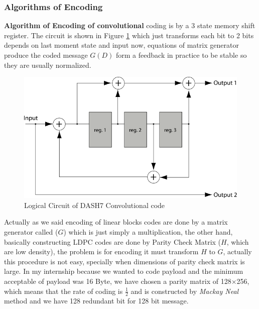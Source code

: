 \subsubsection{Algorithms of Encoding}
\textbf{Algorithm of Encoding of convolutional} coding is by a 3 state memory shift register. The circuit is shown in Figure \ref{conv_block} which just transforms each bit to 2 bits depends on last moment state and input now, equations of matrix generator produce the coded message $G(D)$ form a feedback in practice to be stable so they are usually normalized.

\begin{figure}[h]
\begin{center}
\includegraphics[scale=0.4]{Figures/encoder.png}
\end{center}
\caption{Logical Circuit of DASH7 Convolutional code}
\label{conv_block}
\end{figure}


Actually as we said encoding of linear blocks codes are done by a matrix generator called ($G$) which is just simply a multiplication, the other hand, basically constructing LDPC codes are done by Parity Check Matrix ($H$, which are low density), the problem is for encoding it must transform $H$ to $G$, actually this procedure is not easy, specially when dimensions of parity check matrix is large. In my internship because we wanted to code payload and the minimum acceptable of payload was 16 Byte, we have chosen a parity matrix of 128$\times$256, which means that the rate of coding is $\frac{1}{2}$ and is constructed by \textit{Mackay Neal} method and we have 128 redundant bit for 128 bit message.          

